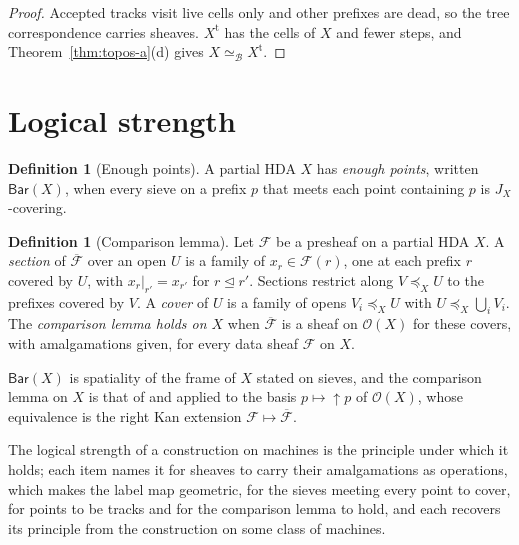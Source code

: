 \documentclass{lmcs}
\theoremstyle{definition}
\newtheorem{definition}[theorem]{Definition}
\theoremstyle{remark}
\newcommand{\Op}{\mathcal{O}}
\newcommand{\ext}{\trianglelefteq}
\newcommand{\JX}[1]{J_{#1}}
\newcommand{\fle}[1]{\preceq_{#1}}
\newcommand{\upc}[1]{{\uparrow}#1}
\newcommand{\BarS}[1]{\mathsf{Bar}(#1)}
\newcommand{\Ext}[1]{\overline{#1}}
\newcommand{\trim}[1]{#1^{\mathrm{t}}}
\providecommand{\eqB}{\simeq_{\mathcal{B}}}
\begin{document}
\begin{proof}
Accepted tracks visit live cells only
and other prefixes are dead, so the tree correspondence carries
sheaves. $\trim{X}$ has the
cells of $X$ and fewer steps, and Theorem~\ref{thm:topos-a}(d) gives
$X\eqB\trim{X}$.
\end{proof}
\section{Logical strength}\label{sec:prices}

\begin{definition}[Enough points]\label{def:setup-bar}
A partial HDA $X$ has \emph{enough points}, written $\BarS{X}$, when every sieve on a prefix $p$ that meets each
point containing $p$ is $\JX{X}$-covering.
\end{definition}

\begin{definition}[Comparison lemma]\label{def:glue}
Let $\mathscr{F}$ be a presheaf on a partial HDA $X$. A \emph{section} of $\Ext{\mathscr{F}}$ over an open $U$ is a
family of $x_r\in\mathscr{F}(r)$, one at each prefix $r$ covered by $U$, with $x_r|_{r'}=x_{r'}$ for
$r\ext r'$. Sections restrict along $V\fle{X}U$ to the prefixes covered by $V$. A \emph{cover} of $U$ is a family of
opens $V_i\fle{X}U$ with $U\fle{X}\bigcup_iV_i$. The \emph{comparison lemma holds on $X$} when $\Ext{\mathscr{F}}$ is a
sheaf on $\Op(X)$ for these covers, with amalgamations given, for every data sheaf $\mathscr{F}$ on $X$.
\end{definition}

$\BarS{X}$ is spatiality of the frame of $X$ stated on sieves, and the comparison lemma on $X$ is that of \cite{Caramello19} and
\cite[Theorem~C2.2.3]{Johnstone02} applied to the basis $p\mapsto\upc{p}$ of
$\Op(X)$, whose equivalence is the right Kan extension $\mathscr{F}\mapsto\Ext{\mathscr{F}}$.

The logical strength of a construction on machines is the principle under which it holds; each item names it for
sheaves to carry their amalgamations as operations, which makes the label map geometric, for the sieves meeting every
point to cover, for points to be tracks and for the comparison lemma to hold, and each recovers its principle from the
construction on some class of machines.
\end{document}
